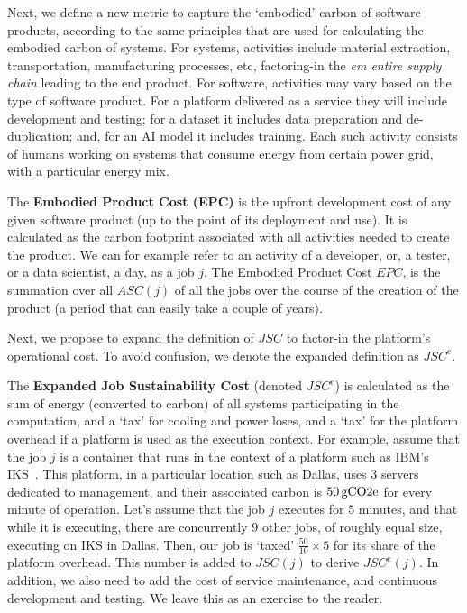 {{        Next, we define a new metric to capture the `embodied' carbon of software products, according to the same principles that are used for calculating the embodied carbon of systems. For systems, activities include material extraction, transportation, manufacturing processes, etc, factoring-in the \textit{em entire supply chain} leading to the end product. For software, activities may vary based on the type of software product. For a platform delivered as a service they will include development and testing; for a dataset it includes data preparation and de-duplication; and, for an AI model it includes training. Each such activity consists of humans working on systems that consume energy from certain power grid, with a particular energy mix.

        The \textbf{Embodied Product Cost (EPC)} is the upfront development cost of any given software product (up to the point of its deployment and use). It is calculated as the carbon footprint associated with all activities needed to create the product. We can for example refer to an activity of a developer, or, a tester, or a data scientist, a day, as a job $j$. The Embodied Product Cost $EPC$, is the summation over all $ASC \! \left ( j \right )$ of all the jobs over the course of the creation of the product (a period that can easily take a couple of years).

        Next, we propose to expand the definition of $JSC$ to factor-in the platform's operational cost. To avoid confusion, we denote the expanded definition as $JSC^e$.

        The \textbf{Expanded Job Sustainability Cost} (denoted $JSC^e$) is calculated as the sum of energy (converted to carbon) of all systems participating in the computation, and a `tax' for cooling and power loses, and a `tax' for the platform overhead if a platform is used as the execution context. For example, assume that the job $j$ is a container that runs in the context of a platform such as IBM's IKS~\cite{IKS}. This platform, in a particular location such as Dallas, uses $3$ servers dedicated to management, and their associated carbon is $\unit[50]{gCO2e}$ for every minute of operation. Let's assume that the job $j$ executes for $5$ minutes, and that while it is executing, there are concurrently $9$ other jobs, of roughly equal size, executing on IKS in Dallas. Then, our job is `taxed' $\frac{50}{10} \times 5$ for its share of the platform overhead. This number is added to $JSC \! \left ( j \right )$ to derive $JSC^e \! \left ( j \right )$.  In addition, we also need to add the cost of service maintenance, and continuous development and testing. We leave this as an exercise to the reader.

}}
